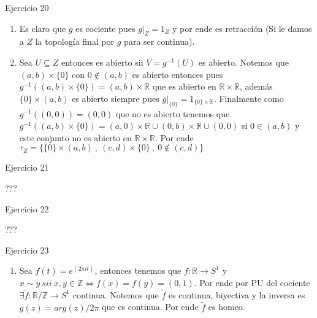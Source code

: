 \documentclass[11pt]{article}
\newcommand{\Z}{\mathbb{Z}}
\newcommand{\R}{{\mathbb{R}}}
\newcommand{\sett}[1]{\{#1\}}
\newcommand{\sette}[2]{\{#1 \ , \ #2 \}}
\newenvironment{proof}[1][Demostraci\'on]{\begin{trivlist}
\item[\hskip \labelsep {\bfseries #1}]}{\end{trivlist}}
\newcommand{\qed}{\nobreak \ifvmode \relax \else
      \ifdim\lastskip<1.5em \hskip-\lastskip
      \hskip1.5em plus0em minus0.5em \fi \nobreak
      \vrule height0.75em width0.5em depth0.25em\fi}
\begin{document}
\begin{enumerate}
\item {Ejercicio 20}

\begin{proof}

\begin{enumerate}

\item Es claro que $g$ es cociente pues $g|_{Z} = 1_Z$ y por ende es retracci\'on (Si le damos a $Z$ la topolog\'ia final por $g$ para ser continua).

\item Sea $U \subseteq Z$ entonces es abierto sii $V = g^{-1}(U)$ es abierto. Notemos que $(a,b) \times \sett{0}$ con $0 \not \in (a,b) $ es abierto entonces pues $g^{-1}((a,b) \times \sett{0}) = (a,b) \times \R$ que es abierto en $\R \times \R$, adem\'as $\sett{0} \times (a,b)$ es abierto siempre pues $g|_{\sett{0}}=1_{\sett{0} \times \R}$. Finalmente como $g^{-1}((0,0)) = (0,0)$ que no es abierto tenemos que  $g^{-1}((a,b) \times \sett{0}) = (a,0) \times \R \cup (0,b) \times \R \cup (0,0)$ si $0 \in (a,b)$ y este conjunto no es abierto en $\R \times \R$. Por ende $\tau_Z = \sette{\sett{0} \times (a,b) \ , \ (c,d) \times \sett{0}}{0 \not \in (c,d)}$ \qed

\end{enumerate}

\end{proof}

\item {Ejercicio 21}

\begin{proof}

???

\end{proof}

\item {Ejercicio 22}

\begin{proof}
???
\end{proof}

\item{Ejercicio 23}

\begin{proof}

\begin{enumerate}

\item Sea $f(t) = e^{(2 \pi i t)}$, entonces tenemos que $f: \R \rightarrow S^1$ y $x \sim y \ sii \ x,y \in \Z \Longleftrightarrow f(x)=f(y)=(0,1)$. Por ende por PU del cociente $\exists \widetilde{f} : \R / \Z \rightarrow S^1$ continua. Notemos que $\widetilde{f}$ es continua, biyectiva y la inversa es $g(z) = arg(z)/ 2 \pi$ que es continua. Por ende $\widetilde{f}$ es homeo.


\end{enumerate}
\end{proof}
\end{enumerate}
\end{document}
